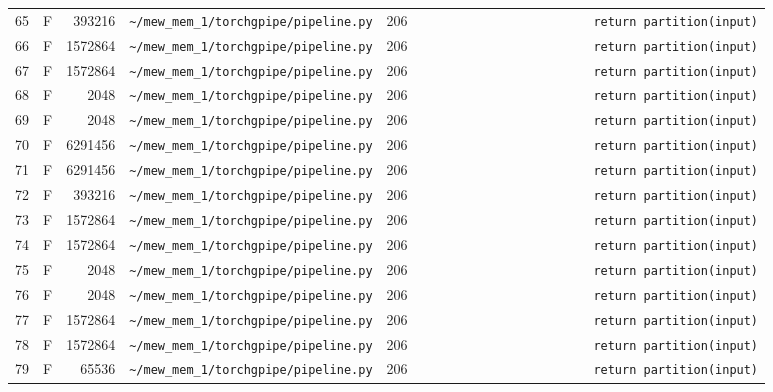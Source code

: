 \documentclass{article}
\begin{document}
\begin{longtable}{r l r p{6.5cm} r p{7.0cm}}
65 & F & 393216 & \lstinline|~/mew_mem_1/torchgpipe/pipeline.py| & 206 & \lstinline|                        return partition(input)| \\
66 & F & 1572864 & \lstinline|~/mew_mem_1/torchgpipe/pipeline.py| & 206 & \lstinline|                        return partition(input)| \\
67 & F & 1572864 & \lstinline|~/mew_mem_1/torchgpipe/pipeline.py| & 206 & \lstinline|                        return partition(input)| \\
68 & F & 2048 & \lstinline|~/mew_mem_1/torchgpipe/pipeline.py| & 206 & \lstinline|                        return partition(input)| \\
69 & F & 2048 & \lstinline|~/mew_mem_1/torchgpipe/pipeline.py| & 206 & \lstinline|                        return partition(input)| \\
70 & F & 6291456 & \lstinline|~/mew_mem_1/torchgpipe/pipeline.py| & 206 & \lstinline|                        return partition(input)| \\
71 & F & 6291456 & \lstinline|~/mew_mem_1/torchgpipe/pipeline.py| & 206 & \lstinline|                        return partition(input)| \\
72 & F & 393216 & \lstinline|~/mew_mem_1/torchgpipe/pipeline.py| & 206 & \lstinline|                        return partition(input)| \\
73 & F & 1572864 & \lstinline|~/mew_mem_1/torchgpipe/pipeline.py| & 206 & \lstinline|                        return partition(input)| \\
74 & F & 1572864 & \lstinline|~/mew_mem_1/torchgpipe/pipeline.py| & 206 & \lstinline|                        return partition(input)| \\
75 & F & 2048 & \lstinline|~/mew_mem_1/torchgpipe/pipeline.py| & 206 & \lstinline|                        return partition(input)| \\
76 & F & 2048 & \lstinline|~/mew_mem_1/torchgpipe/pipeline.py| & 206 & \lstinline|                        return partition(input)| \\
77 & F & 1572864 & \lstinline|~/mew_mem_1/torchgpipe/pipeline.py| & 206 & \lstinline|                        return partition(input)| \\
78 & F & 1572864 & \lstinline|~/mew_mem_1/torchgpipe/pipeline.py| & 206 & \lstinline|                        return partition(input)| \\
79 & F & 65536 & \lstinline|~/mew_mem_1/torchgpipe/pipeline.py| & 206 & \lstinline|                        return partition(input)| \\

\end{longtable}
\end{document}
